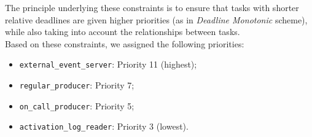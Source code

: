 \documentclass[sigconf, screen]{acmart}
\begin{document}
The principle underlying these constraints is to ensure that tasks with shorter
relative deadlines are given higher priorities (as in \textit{Deadline Monotonic}
scheme), while also taking into account the relationships between tasks. \\
Based on these constraints, we assigned the following priorities:
\begin{itemize}
  \item \texttt{external\_event\_server}: Priority 11 (highest);
  \item \texttt{regular\_producer}: Priority 7;
  \item \texttt{on\_call\_producer}: Priority 5;
  \item \texttt{activation\_log\_reader}: Priority 3 (lowest).
\end{itemize}





\end{document}
